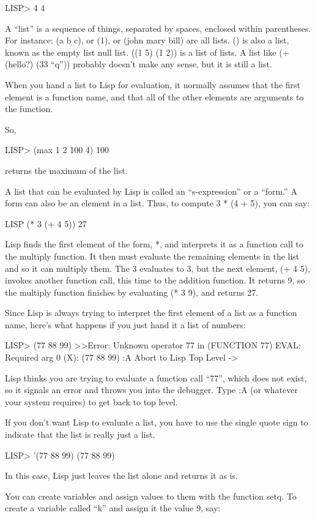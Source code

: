 LISP> 4
4

A ``list'' is a sequence of things, separated by spaces, 
enclosed within parentheses.
For instance: (a b c), or (1), or (john mary bill) are all lists.
() is also a list, known as the empty list null list.
((1 5) (1 2)) is a list of lists.
A list like (+ (hello?) (33 ``q''))
probably doesn't make any sense, but it is still a list.  

When you hand a list to Lisp for evaluation,
it normally assumes that the first element is a
function name, and that all of the other elements are arguments to the
function.

So,

LISP> (max 1 2 100 4)
100

returns the maximum of the list.

A list that can be evaluated by Lisp is called an ``s-expression'' or
a ``form.'' A form can also be an element in a list.  Thus,
to compute 3 * (4 + 5), you can say:

LISP (* 3 (+ 4 5))
27

Lisp finds the first element of the form, *, and interprets it as a function
call to the multiply function.  It then must evaluate the remaining
elements in the list and so it can multiply them. The 3 evaluates to 3,
but the next element, (+ 4 5), invokes another function call, this time
to the addition function.  It returns 9, so the multiply function 
finishes by evaluating (* 3 9), and returns 27.

Since Lisp is always trying to interpret the first element of a list
as a function name, here's what happens if you just hand it a list of
numbers:

LISP> (77 88 99)
>>Error: Unknown operator 77 in (FUNCTION 77)
EVAL:   Required arg 0 (X): (77 88 99)
:A    Abort to Lisp Top Level
-> 

Lisp thinks you are trying to evaluate a function call ``77'', which
does not exist, so it signals an error and throws you into the
debugger.  Type :A (or whatever your system requires) to get back
to top level.

If you don't want Lisp to evaluate a list, you have to use the single
quote sign to indicate that the list is really just a list.

LISP> '(77 88 99)
(77 88 99)

In this case, Lisp just leaves the list alone and returns it as is.

You can create variables and assign values to them with the function
setq.  To create a variable called ``k'' and assign it the value
9, say:

